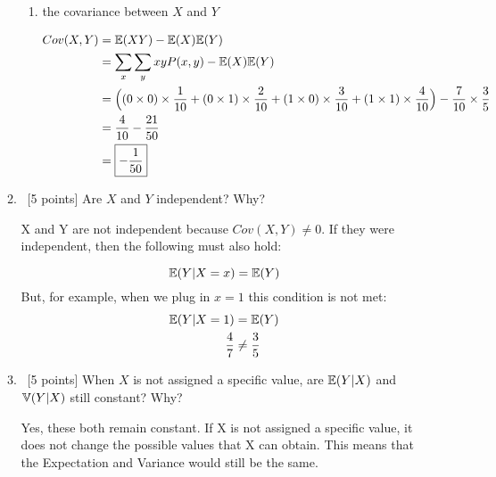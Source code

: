 \documentclass[12pt, fullpage,letterpaper]{article}
\begin{document}
\begin{enumerate}
\begin{enumerate}
\begin{enumerate}
            
            \item  the covariance between $X$ and $Y$
            
            \[
            	\begin{split}
            		Cov(X,Y) &= \mathbb{E}(XY) - \mathbb{E}(X) \mathbb{E}(Y)
            			\\
           				&= \sum_x \sum_y xy P(x,y) - \mathbb{E}(X) \mathbb{E}(Y)
           				\\
           				&= \Big((0 \times 0) \times \frac{1}{10} + (0 \times 1) \times \frac{2}{10} + (1 \times 0) \times \frac{3}{10} + (1 \times 1) \times \frac{4}{10}\Big) - \frac{7}{10} \times \frac{3}{5}
           				\\
           				&= \frac{4}{10} - \frac{21}{50}
           				\\
           				&= \boxed{-\frac{1}{50}}
           		\end{split}
            \]
            
            
            \end{enumerate}
            \item~[5 points] Are $X$ and $Y$ independent? Why?
         
            
            
            X and Y are not independent because $Cov(X,Y) \neq 0$. If they were independent, then the following must also hold:
            
            \[
            	\mathbb{E}(Y|X=x)= \mathbb{E}(Y)
            \]
            But, for example, when we plug in $x=1$ this condition is not met:
            \[
            	\begin{split}
            	\mathbb{E}(Y|X=1) &= \mathbb{E}(Y)
            		\\
            		\frac{4}{7} &\neq \frac{3}{5} 
            		\\
            	\end{split}
            \]
            
            \item~[5 points] When $X$ is not assigned a specific value, are $\mathbb{E}(Y|X)$ and $\mathbb{V}(Y|X)$ still constant? Why?
            
       		Yes, these both remain constant. If X is not assigned a specific value, it does not change the possible values that X can obtain. This means that the Expectation and Variance would still be the same. 
        \end{enumerate}
        
        \pagebreak


\end{enumerate}
\end{document}
